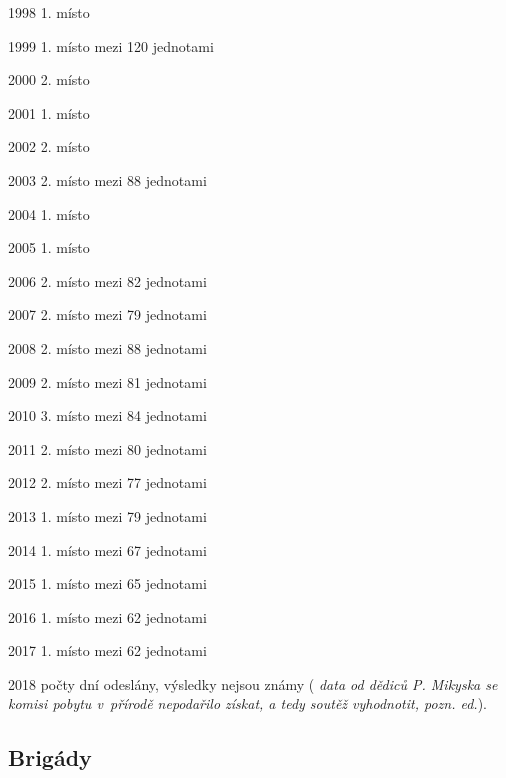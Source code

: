 \documentclass[a5paper, 11pt, twoside]{article}
\newcommand{\pozned}[1]{%
\textit{#1}}
\begin{document}
1998 1. místo

1999 1. místo mezi 120 jednotami

2000 2. místo

2001 1. místo

2002 2. místo

2003 2. místo mezi 88 jednotami

2004 1. místo

2005 1. místo

2006 2. místo mezi 82 jednotami

2007 2. místo mezi 79 jednotami

2008 2. místo mezi 88 jednotami

2009 2. místo mezi 81 jednotami

2010 3. místo mezi 84 jednotami

2011 2. místo mezi 80 jednotami

2012 2. místo mezi 77 jednotami

2013 1. místo mezi 79 jednotami

2014 1. místo mezi 67 jednotami

2015 1. místo mezi 65 jednotami

2016 1. místo mezi 62 jednotami

2017 1. místo mezi 62 jednotami

2018 počty dní odeslány, výsledky nejsou známy (\pozned{data od dědiců P.
Mikyska se komisi pobytu v~přírodě nepodařilo získat, a tedy soutěž
vyhodnotit, pozn. ed.}).

\subsection{Brigády}
\end{document}
